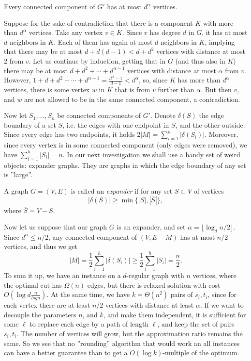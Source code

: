 \begin{lema}
  Every connected component of $G'$ has at most $d^\alpha$ vertices.
\end{lema}
\begin{dokaz}
  Suppose for the sake of contradiction that there is a component $K$ with more than $d^\alpha$ vertices.
  Take any vertex $v\in K$. Since $v$ has degree $d$ in $G$, it has at most $d$ neighbors in $K$. Each of
  them has again at most $d$ neighbors in $K$, implying that there may be at most $d+d(d-1)<d+d^2$ vertices
  with distance at most $2$ from $v$. Let us continue by induction, getting that in $G$ (and thus also in $K$)
  there may be at most
   $d+d^2+\cdots+d^{\alpha-1}$ vertices with distance at most  $\alpha$ from $v$. However,
   $1+d+d^2+\cdots+d^{\alpha-1}=\frac{d^\alpha-1}{d-1}<d^\alpha$, so, since $K$ has more than $d^\alpha$ vertices,
   there is some vertex $w$ in $K$ that is from $v$ further than $\alpha$. But then $v$, and $w$ are not
   allowed to
   be in the same connected component, a contradiction.
\end{dokaz}

\noindent
Now let $S_1,\ldots,S_h$ be connected components of $G'$. Denote $\delta(S)$ the edge boundary of a set $S$, 
i.e. the edges with one endpoint in $S$, and the other outside. Since every edge has two endpoints, it holds
$2|M|=\sum_{i=1}^h|\delta(S_i)|$. Moreover, since every vertex is in some connected component (only edges
were removed), we have $\sum_{i=1}^h|S_i|=n$. In our next investigation we shall use a handy set of weird objects:
expander graphs. They are graphs in which the edge boundary of any set is ''large''. 
\noindent
\begin{framed}
  \begin{dfn}
    A graph $G=(V,E)$ is called an {\em expander} if for any set $S\subset V$ of vertices
    $$|\delta(S)|\ge\min \{ |S|, |\overline{S}|\},$$
    where $\overline{S}=V-S$. 
  \end{dfn}
\end{framed}

\noindent
Now let us suppose that our graph $G$ is an expander, and set  $\alpha=\lfloor\log_d n/2\rfloor$. Since
$d^\alpha\le n/2$, any connected component of  $(V,E-M)$ has at most  $n/2$ vertices, and thus we get
$$|M|=\frac{1}{2}\sum_{i=1}^h|\delta(S_i)|\ge\frac{1}{2}\sum_{i=1}^h|S_i|=\frac{n}{2}.$$
To sum it up, we have an instance on a $d$-regular graph with $n$ vertices, where the optimal cut has 
$\Omega(n)$ edges, but there is relaxed solution with cost $O\left(\log d\frac{n}{log n}\right)$.
At the same time, we have $k=\Theta(n^2)$ pairs of $s_i,t_i$, since for each vertex there are at least $n/2$
vertices with distance at least $\alpha$. If we want to decouple the parameters $n$, and $k$, and
make them independent, it is sufficient for some $\ell$ to replace each edge by a path of length $\ell$, and
keep the set of pairs $s_i,t_i$. The number of vertices will grow, but the approximation ratio remains the same.
So we see that no ''rounding'' algorithm that would work an all instances can have a better guarantee 
than to get a $O(\log k)$-multiple of the optimum.


